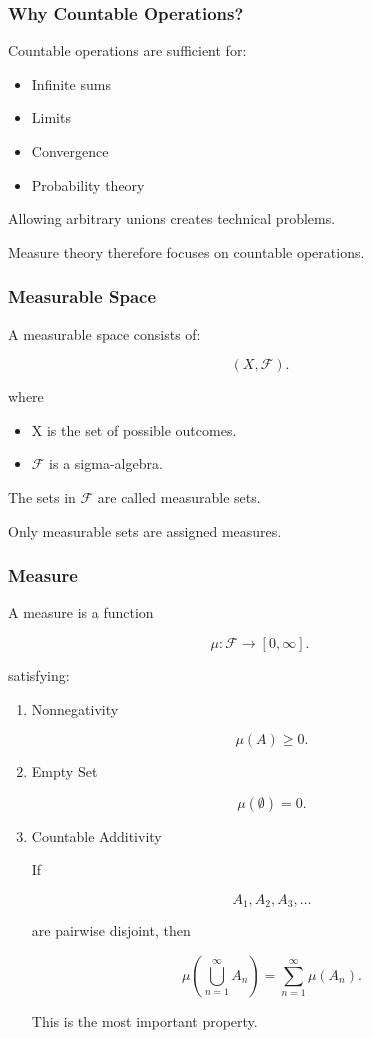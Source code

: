 \documentclass[11pt]{article}
\begin{document}
\subsubsection{Why Countable Operations?}
\label{sec:orge11dc2f}

Countable operations are sufficient for:

\begin{itemize}
\item Infinite sums
\item Limits
\item Convergence
\item Probability theory
\end{itemize}

Allowing arbitrary unions creates technical problems.

Measure theory therefore focuses on countable operations.
\subsubsection{Measurable Space}
\label{sec:orgd5e7814}

A measurable space consists of:

\[
(X,\mathcal F).
\]

where

\begin{itemize}
\item X is the set of possible outcomes.
\item \(\mathcal F\) is a sigma-algebra.
\end{itemize}

The sets in \(\mathcal F\) are called measurable sets.

Only measurable sets are assigned measures.
\subsubsection{Measure}
\label{sec:org82f7442}

A measure is a function

\[
\mu : \mathcal F \to [0,\infty].
\]

satisfying:
\begin{enumerate}
\item Nonnegativity
\label{sec:orge84a250}

\[
\mu(A)\ge 0.
\]
\item Empty Set
\label{sec:org9d7f7dc}

\[
\mu(\emptyset)=0.
\]
\item Countable Additivity
\label{sec:orgbf37dd0}

If

\[
A_1,A_2,A_3,\ldots
\]

are pairwise disjoint, then

\[
\mu\left(
\bigcup_{n=1}^{\infty} A_n
\right)
=
\sum_{n=1}^{\infty}
\mu(A_n).
\]

This is the most important property.
\end{enumerate}
\end{document}
